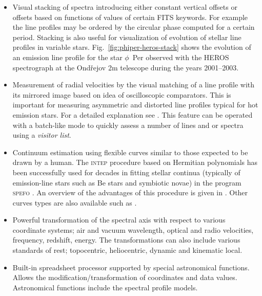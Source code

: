 \documentclass[final,authoryear,5p,times,twocolumn]{elsarticle}
\begin{document}
\begin{itemize}

\item Visual stacking of spectra introducing either constant vertical offsets
  or offsets based on functions of values of certain FITS keywords. For example
  the line profiles may be ordered by the circular phase computed for a
  certain period. Stacking is also useful for visualization of evolution of
  stellar line profiles in variable stars.
  Fig.~\ref{fig:phiper-heros-stack} shows the evolution of an emission line
  profile for the star $\phi$~Per observed with the HEROS spectrograph at
  the Ond\v{r}ejov 2m telescope during the years 2001--2003.

\item Measurement of radial velocities by the visual matching of a line
  profile with its mirrored image based on idea of oscilloscopic comparators.
  This is important for measuring asymmetric and distorted line profiles
  typical for hot emission stars. For a detailed explanation see
  \citet{2007IAUS..240..486P}. This feature can be operated with a batch-like
  mode to quickly assess a number of lines and or spectra using a \emph{visitor list}.

\item Continuum estimation using flexible curves similar to those expected to
  be drawn by a human. The \textsc{intep} procedure based on Hermitian polynomials
  \citep{1982PDAO...16...67H} has been successfully used for decades in
  fitting stellar continua (typically of emission-line stars such as Be stars and
  symbiotic novae) in the program \textsc{spefo} \citep{1996ASPC..101..187S}. An
  overview of the advantages of this procedure is given in
  \citet{2008asvo.proc...97S}. Other curves types are also available such as
  \citet{Akima:1970:NMI:321607.321609}.

\item Powerful transformation of the spectral axis with respect to various
  coordinate systems; air and vacuum wavelength, optical and radio velocities,
  frequency, redshift, energy. The transformations can also include various
  standards of rest; topocentric, heliocentric, dynamic and kinematic local.

\item Built-in spreadsheet processor supported by special astronomical
  functions. Allows the modification/transformation of coordinates and data
  values. Astronomical functions include the spectral profile models.


\end{itemize}
\end{document}
